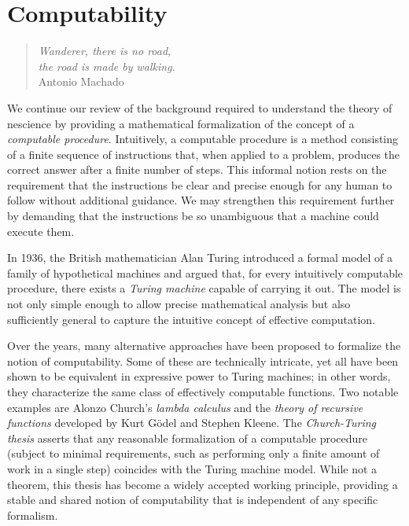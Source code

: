 %
%


\chapter{Computability}
\label{chap:Computability}

\begin{quote}
\begin{flushright}
\emph{Wanderer, there is no road,\\
the road is made by walking.}\\
Antonio Machado
\end{flushright}
\end{quote}
\bigskip

We continue our review of the background required to understand the theory of nescience by providing a mathematical formalization of the concept of a \emph{computable procedure}. Intuitively, a computable procedure is a method consisting of a finite sequence of instructions that, when applied to a problem, produces the correct answer after a finite number of steps. This informal notion rests on the requirement that the instructions be clear and precise enough for any human to follow without additional guidance. We may strengthen this requirement further by demanding that the instructions be so unambiguous that a machine could execute them.

In 1936, the British mathematician Alan Turing introduced a formal model of a family of hypothetical machines and argued that, for every intuitively computable procedure, there exists a \emph{Turing machine} capable of carrying it out. The model is not only simple enough to allow precise mathematical analysis but also sufficiently general to capture the intuitive concept of effective computation.

Over the years, many alternative approaches have been proposed to formalize the notion of computability. Some of these are technically intricate, yet all have been shown to be equivalent in expressive power to Turing machines; in other words, they characterize the same class of effectively computable functions. Two notable examples are Alonzo Church's \emph{lambda calculus} and the \emph{theory of recursive functions} developed by Kurt Gödel and Stephen Kleene. The \emph{Church-Turing thesis} asserts that any reasonable formalization of a computable procedure (subject to minimal requirements, such as performing only a finite amount of work in a single step) coincides with the Turing machine model. While not a theorem, this thesis has become a widely accepted working principle, providing a stable and shared notion of computability that is independent of any specific formalism.

